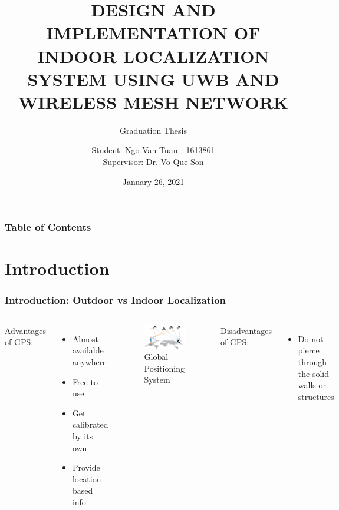 \documentclass[10pt]{beamer}
\title[INDOOR LOCALIZATION SYSTEM]{DESIGN AND IMPLEMENTATION OF INDOOR LOCALIZATION SYSTEM USING UWB AND WIRELESS MESH NETWORK}
\subtitle{Graduation Thesis}
\author[Ngo Van Tuan - 1613861]{Student: Ngo Van Tuan - 1613861\\
Supervisor: Dr. Vo Que Son}
\institute[HCMUT] %
{
  \inst{1}
  FACULTY OF ELECTRICAL AND ELECTRONICS  ENGINEERING\\
  DEPARTMENT OF TELECOMMUNICATIONS ENGINEERING
}
\date{January 26, 2021}
\begin{document}
\frame{\titlepage}

\begin{frame}
    \frametitle{Table of Contents}
    \tableofcontents
\end{frame}


\section{Introduction}

\begin{frame}
\frametitle{Introduction: Outdoor vs Indoor Localization}
\begin{columns}
Advantages of GPS:
\begin{itemize}
    \item Almost available anywhere
    \item Free to use
    \item Get calibrated by its own
    \item Provide location based info
\end{itemize}
\begin{figure}[h]
    \begin{center}
        \includegraphics[width=1\textwidth]{gps.png}
    \end{center}
    \caption{Global Positioning System}
    \label{fig:gps}
\end{figure}
Disadvantages of GPS:
\begin{itemize}
    \item Do not pierce through the solid walls or structures

\end{itemize}
\end{columns}
\end{frame}
\end{document}
